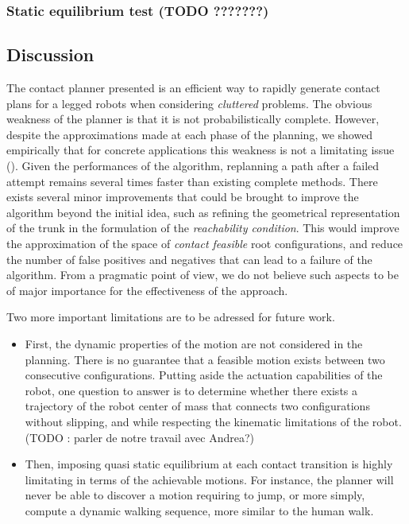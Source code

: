 \subsubsection{Static equilibrium test (TODO ???????)}

\subsection{Discussion}
The contact planner presented is an efficient way to rapidly generate contact plans for a legged robots when considering \textit{cluttered} problems.
The obvious weakness of the planner is that it is not probabilistically complete. However, despite the approximations made at 
each phase of the planning, we showed empirically that for concrete applications this weakness is not a limitating issue (\cite{tonneauijrr16}).
Given the performances of the algorithm, replanning a path after a failed attempt remains several times faster than existing complete methods.
There exists several minor improvements that could be brought to improve the algorithm beyond the initial idea, such as refining the geometrical
representation of the trunk in the formulation of the \textit{reachability condition}. This would improve the approximation of the space of \textit{contact feasible} root configurations,
and reduce the number of false positives and negatives that can lead to a failure of the algorithm. From a pragmatic point of view, we do not believe
such aspects to be of major importance for the effectiveness of the approach.

Two more important limitations are to be adressed for future work.
\begin{itemize}
\item First, the dynamic properties of the motion are not considered in the planning. There is no guarantee that a feasible
motion exists between two consecutive configurations. Putting aside the actuation capabilities of the robot, one question to answer is 
to determine whether there exists a trajectory of the robot center of mass that connects two configurations without slipping, and while 
respecting the kinematic limitations of the robot. (TODO : parler de notre travail avec Andrea?)
\item Then, imposing quasi static equilibrium at each contact transition is highly limitating in terms of the achievable motions. For instance,
the planner will never be able to discover a motion requiring to jump, or more simply, compute a dynamic walking sequence, more similar to the human walk.
\label{sec:steve_discussion}
\end{itemize}
